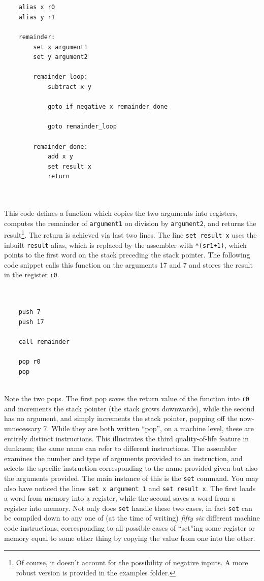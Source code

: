 \documentclass{article}
\begin{document}
\begin{BVerbatim}


    alias x r0
    alias y r1

    remainder:
        set x argument1
        set y argument2
        
        remainder_loop:
	        subtract x y
	        
	        goto_if_negative x remainder_done
	        
	        goto remainder_loop
        
        remainder_done:
	        add x y
	        set result x
	        return
	        
	        
\end{BVerbatim}

This code defines a function which copies the two arguments into registers, computes the remainder of \Verb|argument1| on division by \Verb|argument2|, and returns the result\footnote{Of course, it doesn't account for the possibility of negative inputs. A more robust version is provided in the examples folder.}. The return is achieved via last two lines. The line \Verb|set result x| uses the inbuilt \Verb|result| alias, which is replaced by the assembler with \Verb|*(sr1+1)|, which points to the first word on the stack preceding the stack pointer. The following code snippet calls this function on the arguments 17 and 7 and stores the result in the register \Verb|r0|.

\begin{BVerbatim}


	push 7
	push 17

	call remainder

	pop r0
	pop


\end{BVerbatim}

Note the two pops. The first pop saves the return value of the function into \Verb|r0| and increments the stack pointer (the stack grows downwards), while the second has no argument, and simply increments the stack pointer, popping off the now-unnecessary 7. While they are both written ``pop'', on a machine level, these are entirely distinct instructions. This illustrates the third quality-of-life feature in dunkasm; the same name can refer to different instructions. The assembler examines the number and type of arguments provided to an instruction, and selects the specific instruction corresponding to the name provided given but also the arguments provided. The main instance of this is the \Verb|set| command. You may also have noticed the lines \Verb|set x argument 1| and \Verb|set result x|. The first loads a word from memory into a register, while the second saves a word from a register into memory. Not only does \Verb|set| handle these two cases, in fact \Verb|set| can be compiled down to any one of (at the time of writing) \textit{fifty six} different machine code instructions, corresponding to all possible cases of ``set''ing some register or memory equal to some other thing by copying the value from one into the other.
\end{document}
